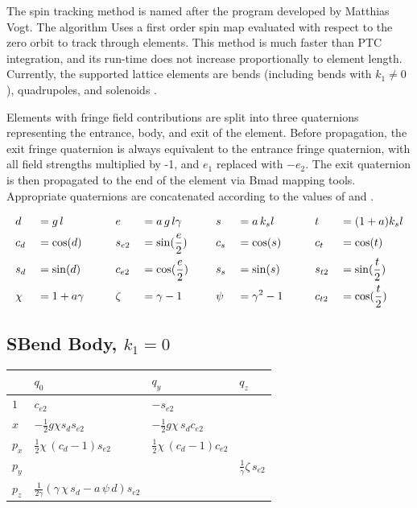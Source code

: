The  spin tracking method is named after the  program developed by Matthias
Vogt.  The  algorithm Uses a first order spin map evaluated with respect to the zero
orbit to track through elements. This method is much faster than PTC integration, and its run-time
does not increase proportionally to element length. Currently, the supported lattice elements are
bends (including bends with $k_1 \neq 0$), quadrupoles, and solenoids .

Elements with fringe field contributions are split into three quaternions representing the entrance,
body, and exit of the element. Before propagation, the exit fringe quaternion is always equivalent
to the entrance fringe quaternion, with all field strengths multiplied by -1, and $e_1$ replaced
with $-e_2$. The exit quaternion is then propagated to the end of the element via Bmad mapping
tools. Appropriate quaternions are concatenated according to the values of  and
.

\begin{alignat}{8}
 & {d}    &&= g \, l              && {e}    &&= a \, g \, l\gamma   && s     &&= a \, k_s l       && {t}    &&= (1+a) k_s l         \nonumber \\
 & c_{d}  &&= \cos({d})    \qquad && s_{e2} &&= \sin(\frac{{e}}{2}) && c_{s} &&= \cos({s}) \qquad && c_{t}  &&= \cos({t})           \\
 & s_{d}  &&= \sin({d})           && c_{e2} &&= \cos(\frac{{e}}{2}) && s_{s} &&= \sin({s})        && s_{t2} &&= \sin(\frac{{t}}{2}) \nonumber \\
 & \chi   &&= 1+a\gamma           && \zeta  &&= \gamma - 1   \qquad && \psi  &&= \gamma^2 - 1     && c_{t2} &&= \cos(\frac{{t}}{2}) \nonumber
\end{alignat}

\subsection{SBend Body, $k_1 = 0$}

\begin{center}
\begin{tabular}{llll} \toprule
        & $q_0$    & $q_y$     & $q_z$ \\ \midrule
  $1$   & $c_{e2}$ & $-s_{e2}$ &       \\ \addlinespace[1ex]
  $x$   & $-\frac{1}{2} g \chi s_{d} s_{e2}$ & $-\frac{1}{2} g \chi \, s_{d} c_{e2}$ & \\ \addlinespace[1ex]
  $p_x$ & $\frac{1}{2} \chi \, (c_{d} - 1)  s_{e2}$ & $\frac{1}{2} \chi \, (c_{d} - 1) c_{e2}$ & \\ \addlinespace[1ex]
  $p_y$ &          &           & $\frac{1}{\gamma} \zeta \, s_{e2}$ \\ \addlinespace[1ex]
  $p_z$ & $\frac{1}{2 \gamma} \left(\gamma \, \chi \, s_{d} -a \, \psi \, {d} \right) s_{e2}$ & & \\
  \bottomrule
\end{tabular}
\end{center}

